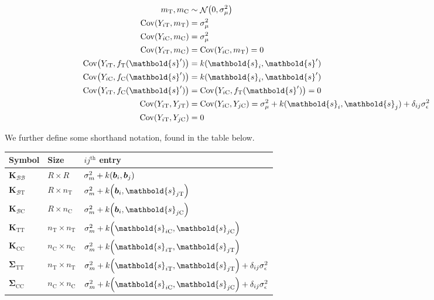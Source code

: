 \documentclass[letter,12pt]{article}
\DeclarePairedDelimiter{\parenthesis}{\lparen}{\rparen}
\newcommand{\del}[1]{\parenthesis*{#1}}
\DeclareMathOperator{\cov}{{Cov}}
\DeclareMathOperator{\normal}{\mathcal{N}}
\newcommand{\treat}{\mathrm{T}}
\newcommand{\ctrol}{\mathrm{C}}
\newcommand{\sigman}{\sigma_{\epsilon}}
\newcommand{\sigmamu}{\sigma_{\mu}}
\newcommand{\svec}{\mathbold{s}}
\newcommand{\border}{\mathcal{B}}
\newcommand{\sentinel}{\bm{b}}
\newcommand{\numsent}{R}
\newcommand{\eqlabel}[1]{\label{#1}}
\newcommand{\Kmat}{\mathbold{K}}
\newcommand{\SigmaMat}{\mathbold{\Sigma}}
\newcommand{\KBB}{\Kmat_{\border \border}}
\newcommand{\KBT}{\Kmat_{\border \treat}}
\newcommand{\KBC}{\Kmat_{\border \ctrol}}
\newcommand{\STT}{\SigmaMat_{\treat \treat}}
\newcommand{\SCC}{\SigmaMat_{\ctrol \ctrol}}
\newcommand{\KTT}{\Kmat_{\treat \treat}}
\newcommand{\KCC}{\Kmat_{\ctrol \ctrol}}
\begin{document}
\begin{equation}
    \begin{split}
        m_\treat, m_\ctrol   &\sim \normal\del{0,\sigmamu^2} \\
        \cov(Y_{i\treat},m_\treat)  &= \sigmamu^2 \\
        \cov(Y_{i\ctrol},m_\ctrol)  &= \sigmamu^2 \\
        \cov(Y_{i\treat},m_\ctrol)  &= \cov(Y_{i\ctrol},m_\treat)  = 0 \\
        \cov\del{Y_{i\treat}, f_{\treat}(\svec')} &= k(\svec_i,\svec') \\
        \cov\del{Y_{i\ctrol}, f_{\ctrol}(\svec')} &= k(\svec_i,\svec') \\
        \cov\del{Y_{i\treat}, f_{\ctrol}(\svec')} &= \cov\del{Y_{i\ctrol}, f_{\treat}(\svec')} = 0 \\
        \cov(Y_{i\treat},Y_{j\treat}) &= \cov(Y_{i\ctrol},Y_{j\ctrol}) = \sigmamu^2 + k(\svec_i,\svec_j) + \delta_{ij}\sigman^2 \\
        \cov(Y_{i\treat},Y_{j\ctrol}) &= 0
    \end{split}
    \eqlabel{eq:covariances}
\end{equation}



We further define some shorthand notation, found in the table below.

\begin{center}
    \begin{tabular}{lll}
        \hline
        Symbol & Size                       & $ij^{\mathrm{th}}$ entry                                                      \\ \hline
        $\KBB$ & $\numsent \times \numsent$ & $\sigma_m^2 + k\del{\sentinel_i,\sentinel_j}$                                 \\ 
        $\KBT$ & $\numsent \times n_\treat$ & $\sigma_m^2 + k\del{\sentinel_i,\svec_{j\treat}}$                             \\ 
        $\KBC$ & $\numsent \times n_\ctrol$ & $\sigma_m^2 + k\del{\sentinel_i,\svec_{j\ctrol}}$                             \\
        $\KTT$ & $n_\treat \times n_\treat$ & $\sigma_m^2 + k\del{\svec_{i\ctrol},\svec_{j\ctrol}}$                         \\
        $\KCC$ & $n_\ctrol \times n_\ctrol$ & $\sigma_m^2 + k\del{\svec_{i\treat},\svec_{j\treat}}$                         \\ 
        $\STT$ & $n_\treat \times n_\treat$ & $\sigma_m^2 + k\del{\svec_{i\treat},\svec_{j\treat}} + \delta_{ij} \sigman^2$ \\ 
        $\SCC$ & $n_\ctrol \times n_\ctrol$ & $\sigma_m^2 + k\del{\svec_{i\ctrol},\svec_{j\ctrol}} + \delta_{ij} \sigman^2$ \\
        \hline
    \end{tabular}
\end{center}
\end{document}
